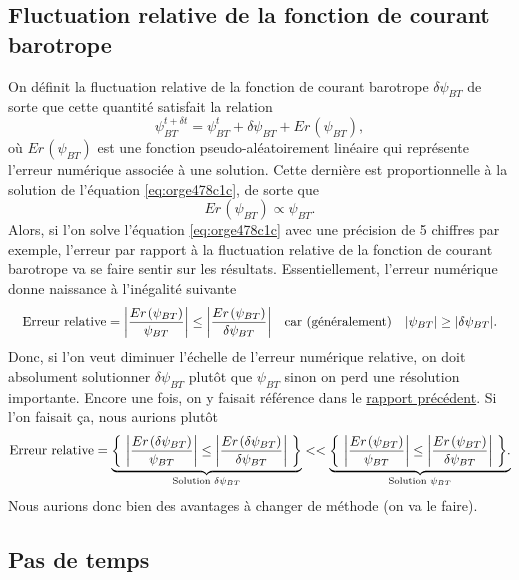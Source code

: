 \documentclass[10pt]{report}
\numberwithin{equation}{section}
\newcommand{\pt}{\hspace{1pt}} %
\begin{document}
\subsection{Fluctuation relative de la fonction de courant barotrope}
\label{sec:org25e6af2}
On définit la fluctuation relative de la fonction de courant barotrope \(\delta \psi_{BT}\) de sorte que cette quantité satisfait la relation
\begin{equation}
   \psi_{BT}^{t+\delta t} = \psi_{BT}^t + \delta \psi_{BT} + Er\pt(\psi_{BT}),
\end{equation}
où \(Er\pt(\psi_{BT})\) est une fonction pseudo-aléatoirement linéaire qui représente l'erreur numérique associée à une solution.
Cette dernière est proportionnelle à la solution de l'équation \ref{eq:orge478c1c}, de sorte que
\begin{equation}
    Er\pt(\psi_{BT}) \propto \psi_{BT}.
\end{equation}
Alors, si l'on solve l'équation \ref{eq:orge478c1c} avec une précision de 5 chiffres par exemple, l'erreur par rapport à la fluctuation relative de la fonction de courant barotrope va se faire sentir sur les résultats.
Essentiellement, l'erreur numérique donne naissance à l'inégalité suivante
\begin{align}
   &&\text{Erreur relative} = \abs{\frac{Er\pt(\psi_{BT})}{\psi_{BT}}} \le \abs{ \frac{Er\pt(\psi_{BT})}{\delta \psi_{BT}} } &&\text{car (généralement)} && \abs{\psi_{BT}} \ge \abs{\delta \psi_{BT}}. &&
\end{align}
Donc, si l'on veut diminuer l'échelle de l'erreur numérique relative, on doit absolument solutionner \(\delta \psi_{BT}\) plutôt que \(\psi_{BT}\) sinon on perd une résolution importante.
Encore une fois, on y faisait référence dans le \href{rapport-2023-04-28.org}{rapport précédent}.
Si l'on faisait ça, nous aurions plutôt
\begin{align}
   \text{Erreur relative} = \underbrace{\qty{\ \abs{\frac{Er\pt(\delta\psi_{BT})}{\psi_{BT}}} \le \abs{ \frac{Er\pt(\delta\psi_{BT})}{\delta \psi_{BT}} }\ }}_\text{Solution $\delta \psi_{BT}$}
   <<
   \underbrace{\qty{\ \abs{\frac{Er\pt(\psi_{BT})}{\psi_{BT}}} \le \abs{ \frac{Er\pt(\psi_{BT})}{\delta \psi_{BT}} }\ }.}_\text{Solution $\psi_{BT}$}
\end{align}
Nous aurions donc bien des avantages à changer de méthode (on va le faire).

\subsection{Pas de temps}
\label{sec:org5f47612}
\end{document}
